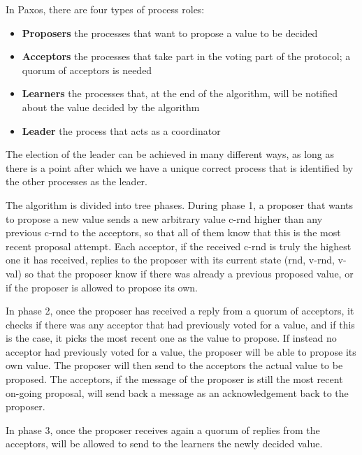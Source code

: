 In Paxos, there are four types of process roles:
\begin{itemize}
  \item \textbf{Proposers} the processes that want to propose a value to be decided
  \item \textbf{Acceptors} the processes that take part in the voting part of the protocol; a quorum of acceptors is needed
  \item \textbf{Learners} the processes that, at the end of the algorithm, will be notified about the value decided by the algorithm
  \item \textbf{Leader} the process that acts as a coordinator
\end{itemize}

The election of the leader can be achieved in many different ways, as long as there is a point after which we have a unique correct process that is identified by the other processes as the leader.

The algorithm is divided into tree phases. During phase 1, a proposer that wants to propose a new value sends a new arbitrary value c-rnd higher than any previous c-rnd to the acceptors, so that all of them know that this is the most recent proposal attempt. Each acceptor, if the received c-rnd is truly the highest one it has received, replies to the proposer with its current state (rnd, v-rnd, v-val) so that the proposer know if there was already a previous proposed value, or if the proposer is allowed to propose its own.

In phase 2, once the proposer has received a reply from a quorum of acceptors, it checks if there was any acceptor that had previously voted for a value, and if this is the case, it picks the most recent one as the value to propose. If instead no acceptor had previously voted for a value, the proposer will be able to propose its own value. The proposer will then send to the acceptors the actual value to be proposed.
The acceptors, if the message of the proposer is still the most recent on-going proposal, will send back a message as an acknowledgement back to the proposer.

In phase 3, once the proposer receives again a quorum of replies from the acceptors, will be allowed to send to the learners the newly decided value.

